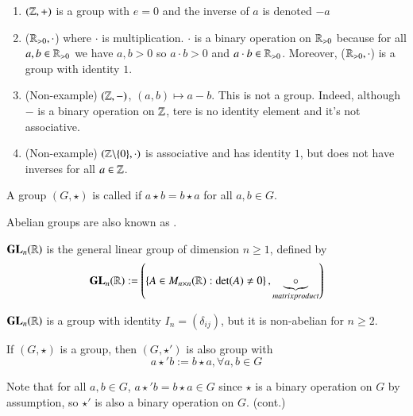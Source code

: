 \documentclass[12pt, a4paper, twoside, openright, titlepage]{book}
\begin{document}
\begin{eg}{}{}
    \leavevmode
    \begin{enumerate}
        \item $(\mathbb Z,+)$ is a group with $e = 0$ and the inverse of $a$ is denoted $-a$
        \item ($\mathbb R_{>0},\cdot$) where $\cdot$ is multiplication. $\cdot$ is a binary operation on $\mathbb R_{>0}$ because for all $a,b \in \mathbb R_{>0}$ we have $a,b >0$ so $a\cdot b > 0$ and $a \cdot b \in \mathbb R_{>0}$. Moreover, ($\mathbb R_{>0},\cdot$) is a group with identity $1$.
        \item (Non-example) $(\mathbb Z,-)$, $(a,b)\mapsto a-b$. This is not a group. Indeed, although $-$ is a binary operation on $\mathbb Z$, tere is no identity element and it's not associative.
        \item (Non-example) $(\mathbb Z\backslash \{0\},\cdot)$ is associative and has identity $1$, but does not have inverses for all $a \in \mathbb Z$.
    \end{enumerate}
\end{eg}

\begin{defn}{}{}
    A group $(G,\star)$ is called  if $a \star b = b \star a$ for all $a, b \in G$.
    \begin{rmk}{}{}
        Abelian groups are also known as .
    \end{rmk}
\end{defn}


\begin{eg}{}{}
    $\mathbf{GL}_n(\mathbb R)$ is the general linear group of dimension $n \geq 1$, defined by \begin{equation}
        \mathbf{GL}_n(\mathbb R) := \left(\left\{ A \in M_{n\times n}(\mathbb R): \det(A) \neq 0\right\},\underbrace{\circ}_{matrix product}\right)
    \end{equation}
    \begin{xca*}{}{}
        $\mathbf{GL}_n(\mathbb R)$ is a group with identity $I_n = (\delta_{ij})$, but it is non-abelian for $n \geq 2$.
    \end{xca*}
\end{eg}

\begin{xca*}{}{}
    If $(G,\star)$ is a group, then $(G,\star')$ is also group with $$a \star' b := b\star a, \forall a,b \in G$$
    \begin{proof*}{}{}
        Note that for all $a,b \in G$, $a \star' b = b \star a \in G$ since $\star$ is a binary operation on $G$ by assumption, so $\star'$ is also a binary operation on $G$. (cont.)
    \end{proof*}
\end{xca*}
\end{document}
